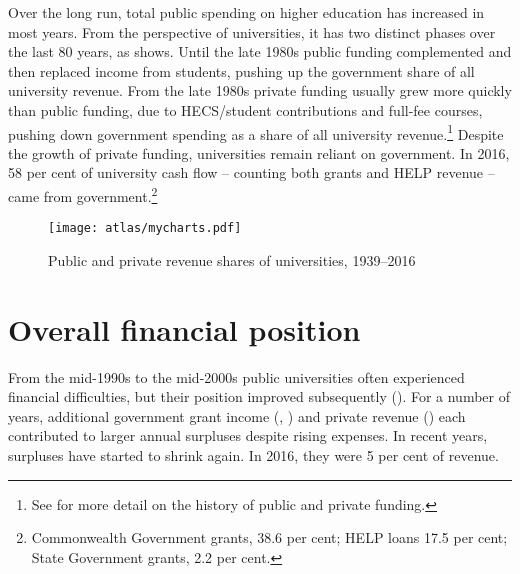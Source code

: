 \documentclass{grattan}
\begin{document}
Over the long run, total public spending on higher education has increased in most years. From the perspective of universities, it has two distinct phases over the last 80 years, as  shows. Until the late 1980s public funding complemented and then replaced income from students, pushing up the government share of all university revenue. From the late 1980s private funding usually grew more quickly than public funding, due to HECS/student contributions and full-fee courses, pushing down government spending as a share of all university revenue.\footnote{See \textcite[][]{Norton2017howcanthegovernm} for more detail on the history of public and private funding.} Despite the growth of private funding, universities remain reliant on government. In 2016, 58 per cent of university cash flow -- counting both grants and HELP revenue -- came from government.\footnote{Commonwealth Government grants, 38.6 per cent; HELP loans 17.5 per cent; State Government grants, 2.2 per cent.}

    \begin{figure} %
    \caption{Public and private revenue shares of universities, 1939--2016}\label{fig:public-and-private-revenue-shares-of-universities-19392016}
    \units{}
    \texttt{[image: atlas/mycharts.pdf]}
    \end{figure}


%
\section{Overall financial position }\label{sec:overall-financial-position}

From the mid-1990s to the mid-2000s public universities often experienced financial difficulties, but their position improved subsequently (). For a number of years, additional government grant income (, ) and private revenue () each contributed to larger annual surpluses despite rising expenses. In recent years, surpluses have started to shrink again. In 2016, they were 5 per cent of revenue.
\end{document}
